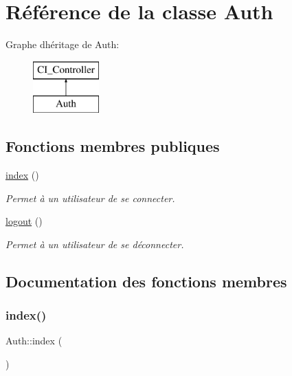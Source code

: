 \hypertarget{class_auth}{}\section{Référence de la classe Auth}
\label{class_auth}
Graphe d\textquotesingle{}héritage de Auth\+:\begin{figure}[H]
\begin{center}
\leavevmode
\includegraphics[height=2.000000cm]{class_auth}
\end{center}
\end{figure}
\subsection*{Fonctions membres publiques}
\begin{DoxyCompactItemize}
\item 
\hyperlink{class_auth_a731a68cd315d7411829386a75edb9b6d}{index} ()
\begin{DoxyCompactList}\small\item\em Permet à un utilisateur de se connecter. \end{DoxyCompactList}\item 
\hyperlink{class_auth_acbbcb54916a234d1d816ec85e4a88d5e}{logout} ()
\begin{DoxyCompactList}\small\item\em Permet à un utilisateur de se déconnecter. \end{DoxyCompactList}\end{DoxyCompactItemize}


\subsection{Documentation des fonctions membres}
\mbox{\label{class_auth_a731a68cd315d7411829386a75edb9b6d}} 
\subsubsection{\texorpdfstring{index()}{index()}}
{\footnotesize\ttfamily Auth\+::index (\begin{DoxyParamCaption}{ }\end{DoxyParamCaption})}




